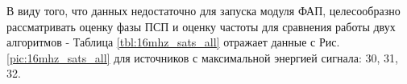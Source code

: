 В виду того, что данных недостаточно для запуска модуля ФАП, целесообразно рассматривать оценку фазы ПСП и оценку частоты для сравнения работы двух
алгоритмов - Таблица \ref{tbl:16mhz_sats_all} отражает данные с Рис. \ref{pic:16mhz_sats_all} для источников с максимальной энергией сигнала: 30, 31, 32.
